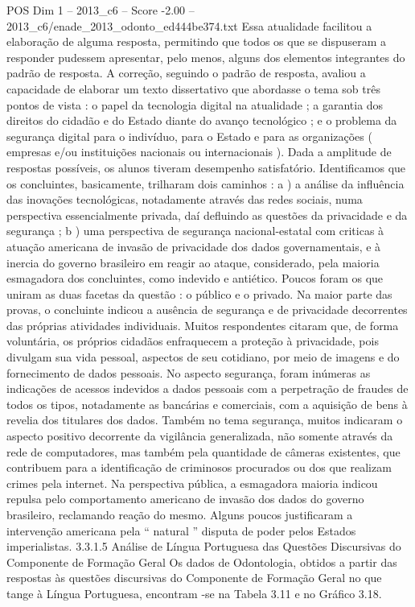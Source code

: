 \begin{textsample}{POS Dim 1 – 2013\_c6 – Score -2.00 – 2013\_c6/enade\_2013\_odonto\_ed444be374.txt}
Essa atualidade facilitou a elaboração de alguma resposta, permitindo que todos os que se dispuseram a responder pudessem apresentar, pelo menos, alguns dos elementos integrantes do padrão de resposta.
A correção, seguindo o padrão de resposta, avaliou a capacidade de elaborar um texto dissertativo que abordasse o tema sob três pontos de vista : o papel da tecnologia digital na atualidade ; a garantia dos direitos do cidadão e do Estado diante do avanço tecnológico ; e o problema da segurança digital para o indivíduo, para o Estado e para as organizações ( empresas e/ou instituições nacionais ou internacionais ).
Dada a amplitude de respostas possíveis, os alunos tiveram desempenho satisfatório.
Identificamos que os concluintes, basicamente, trilharam dois caminhos : a ) a análise da influência das inovações tecnológicas, notadamente através das redes sociais, numa perspectiva essencialmente privada, daí defluindo as questões da privacidade e da segurança ; b ) uma perspectiva de segurança nacional-estatal com criticas à atuação americana de invasão de privacidade dos dados governamentais, e à inercia do governo brasileiro em reagir ao ataque, considerado, pela maioria esmagadora dos concluintes, como indevido e antiético.
Poucos foram os que uniram as duas facetas da questão : o público e o privado.
Na maior parte das provas, o concluinte indicou a ausência de segurança e de privacidade decorrentes das próprias atividades individuais.
Muitos respondentes citaram que, de forma voluntária, os próprios cidadãos enfraquecem a proteção à privacidade, pois divulgam sua vida pessoal, aspectos de seu cotidiano, por meio de imagens e do fornecimento de dados pessoais.
No aspecto segurança, foram inúmeras as indicações de acessos indevidos a dados pessoais com a perpetração de fraudes de todos os tipos, notadamente as bancárias e comerciais, com a aquisição de bens à revelia dos titulares dos dados.
Também no tema segurança, muitos indicaram o aspecto positivo decorrente da vigilância generalizada, não somente através da rede de computadores, mas também pela quantidade de câmeras existentes, que contribuem para a identificação de criminosos procurados ou dos que realizam crimes pela internet.
Na perspectiva pública, a esmagadora maioria indicou repulsa pelo comportamento americano de invasão dos dados do governo brasileiro, reclamando reação do mesmo.
Alguns poucos justificaram a intervenção americana pela “ natural ” disputa de poder pelos Estados imperialistas. 3.3.1.5 Análise de Língua Portuguesa das Questões Discursivas do Componente de Formação Geral Os dados de Odontologia, obtidos a partir das respostas às questões discursivas do Componente de Formação Geral no que tange à Língua Portuguesa, encontram -se na Tabela 3.11 e no Gráfico 3.18.

\end{textsample}
